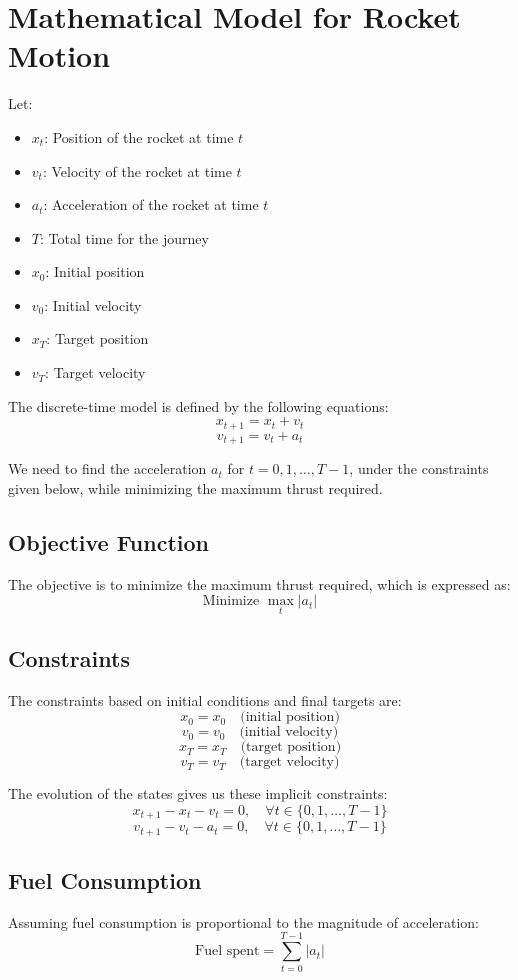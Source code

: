 \documentclass{article}
\begin{document}
\section*{Mathematical Model for Rocket Motion}

Let:
\begin{itemize}
    \item \( x_t \): Position of the rocket at time \( t \)
    \item \( v_t \): Velocity of the rocket at time \( t \)
    \item \( a_t \): Acceleration of the rocket at time \( t \)
    \item \( T \): Total time for the journey
    \item \( x_0 \): Initial position
    \item \( v_0 \): Initial velocity
    \item \( x_T \): Target position
    \item \( v_T \): Target velocity
\end{itemize}

The discrete-time model is defined by the following equations:
\[
x_{t+1} = x_t + v_t
\]
\[
v_{t+1} = v_t + a_t
\]

We need to find the acceleration \( a_t \) for \( t = 0, 1, \ldots, T-1 \), under the constraints given below, while minimizing the maximum thrust required.

\subsection*{Objective Function}
The objective is to minimize the maximum thrust required, which is expressed as:
\[
\text{Minimize } \max_{t} |a_t|
\]

\subsection*{Constraints}
The constraints based on initial conditions and final targets are:
\[
x_0 = x_0 \quad \text{(initial position)}
\]
\[
v_0 = v_0 \quad \text{(initial velocity)}
\]
\[
x_T = x_T \quad \text{(target position)}
\]
\[
v_T = v_T \quad \text{(target velocity)}
\]

The evolution of the states gives us these implicit constraints:
\[
x_{t+1} - x_t - v_t = 0, \quad \forall t \in \{0, 1, \ldots, T-1\}
\]
\[
v_{t+1} - v_t - a_t = 0, \quad \forall t \in \{0, 1, \ldots, T-1\}
\]

\subsection*{Fuel Consumption}
Assuming fuel consumption is proportional to the magnitude of acceleration:
\[
\text{Fuel spent} = \sum_{t=0}^{T-1} |a_t|
\]
\end{document}
